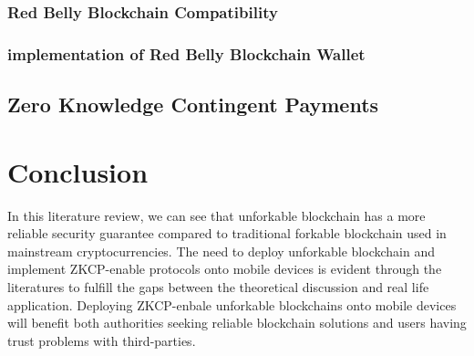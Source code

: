 \documentclass[12pt]{article}
\begin{document}
\subsubsection{Red Belly Blockchain Compatibility}

\subsubsection{implementation of Red Belly Blockchain Wallet}


\subsection{Zero Knowledge Contingent Payments}


\section{Conclusion}

In this literature review, we can see that unforkable blockchain has a more reliable security guarantee compared to traditional forkable blockchain used in mainstream cryptocurrencies. The need to deploy unforkable blockchain and implement ZKCP-enable protocols onto mobile devices is evident through the literatures to fulfill the gaps between the theoretical discussion and real life application. Deploying ZKCP-enbale unforkable blockchains onto mobile devices will benefit both authorities seeking reliable blockchain solutions and users having trust problems with third-parties.

\newpage


\end{document}
